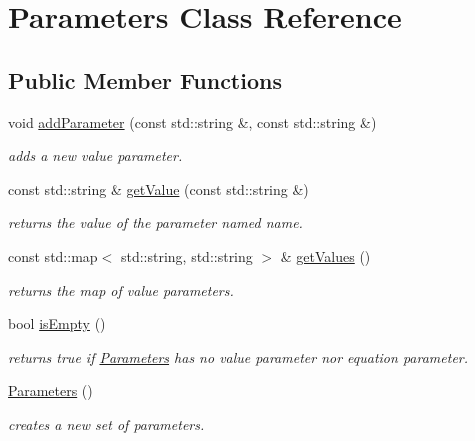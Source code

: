 \hypertarget{class_open_chams_1_1_parameters}{}\section{Parameters Class Reference}
\label{class_open_chams_1_1_parameters}
\subsection*{Public Member Functions}
\begin{DoxyCompactItemize}
\item 
void \hyperlink{class_open_chams_1_1_parameters_a9ad9a7acc15a142788270ccd255b5e91}{add\+Parameter} (const std\+::string \&, const std\+::string \&)
\begin{DoxyCompactList}\small\item\em adds a new value parameter. \end{DoxyCompactList}\item 
const std\+::string \& \hyperlink{class_open_chams_1_1_parameters_a41b343d6037f531fd92912b453b40f2b}{get\+Value} (const std\+::string \&)
\begin{DoxyCompactList}\small\item\em returns the value of the parameter named {\ttfamily name}. \end{DoxyCompactList}\item 
\mbox{\label{class_open_chams_1_1_parameters_a0f890d16c3b2a0bcbdf060854ea07877}} 
const std\+::map$<$ std\+::string, std\+::string $>$ \& \hyperlink{class_open_chams_1_1_parameters_a0f890d16c3b2a0bcbdf060854ea07877}{get\+Values} ()
\begin{DoxyCompactList}\small\item\em returns the map of value parameters. \end{DoxyCompactList}\item 
\mbox{\label{class_open_chams_1_1_parameters_af337ffd75e4f019ce15302c60715d84b}} 
bool \hyperlink{class_open_chams_1_1_parameters_af337ffd75e4f019ce15302c60715d84b}{is\+Empty} ()
\begin{DoxyCompactList}\small\item\em returns true if \hyperlink{class_open_chams_1_1_parameters}{Parameters} has no value parameter nor equation parameter. \end{DoxyCompactList}\item 
\mbox{\label{class_open_chams_1_1_parameters_a061bbedbf4fbd963871a388f5e8ebb61}} 
\hyperlink{class_open_chams_1_1_parameters_a061bbedbf4fbd963871a388f5e8ebb61}{Parameters} ()
\begin{DoxyCompactList}\small\item\em creates a new set of parameters. \end{DoxyCompactList}\end{DoxyCompactItemize}



